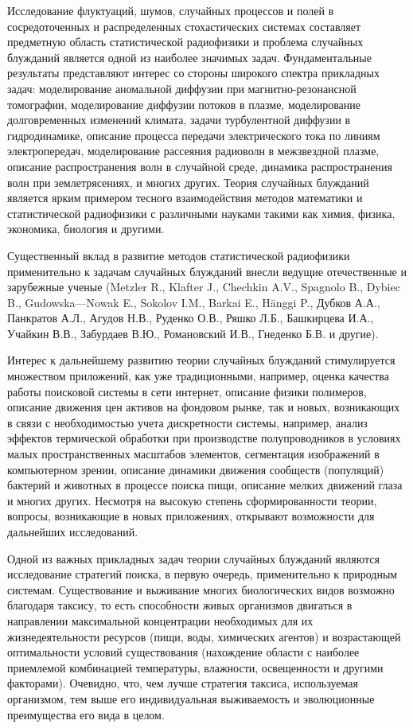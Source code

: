 
{\actuality} 

Исследование флуктуаций, шумов, случайных процессов и полей в сосредоточенных и распределенных стохастических системах составляет предметную область статистической радиофизики и проблема случайных блужданий является одной из наиболее значимых задач. Фундаментальные результаты представляют интерес со стороны широкого спектра прикладных задач: моделирование аномальной диффузии при магнитно-резонансной томографии, моделирование диффузии потоков в плазме, моделирование долговременных изменений климата, задачи турбулентной диффузии в гидродинамике, описание процесса передачи электрического тока по линиям электропередач, моделирование рассеяния радиоволн в межзвездной плазме, описание распространения волн в случайной среде, динамика распространения волн при землетрясениях, и многих других. Теория случайных блужданий является ярким примером тесного взаимодействия методов математики и статистической радиофизики с различными науками такими как химия, физика, экономика, биология и другими.

Существенный вклад в развитие методов статистической радиофизики применительно к задачам случайных блужданий внесли ведущие отечественные и зарубежные ученые (Metzler R., Klafter J., Chechkin A.V., Spagnolo B., Dybiec B., Gudowska—Nowak E., Sokolov I.M., Barkai E., Hänggi P., Дубков А.А., Панкратов А.Л., Агудов Н.В., Руденко О.В., Ряшко Л.Б., Башкирцева И.А., Учайкин В.В., Забурдаев В.Ю., Романовский И.В., Гнеденко Б.В. и другие).

Интерес к дальнейшему развитию теории случайных блужданий стимулируется множеством приложений, как уже традиционными, например, оценка качества работы поисковой системы в сети интернет, описание физики полимеров, описание движения цен активов на фондовом рынке, так и новых, возникающих в связи с необходимостью учета дискретности системы, например, анализ эффектов термической обработки при производстве полупроводников в условиях малых пространственных масштабов элементов, сегментация изображений в компьютерном зрении, описание динамики движения сообществ (популяций) бактерий и животных в процессе поиска пищи, описание мелких движений глаза и многих других. Несмотря на высокую степень сформированности теории, вопросы, возникающие в новых приложениях, открывают возможности для дальнейших исследований. 

Одной из важных прикладных задач теории случайных блужданий являются исследование стратегий поиска, в первую очередь, применительно к природным системам. Существование и выживание многих биологических видов возможно благодаря таксису, то есть способности живых организмов двигаться в направлении максимальной концентрации необходимых для их жизнедеятельности ресурсов (пищи, воды, химических агентов) и возрастающей оптимальности условий существования (нахождение области с наиболее приемлемой комбинацией температуры, влажности, освещенности и другими факторами). Очевидно, что, чем лучше стратегия таксиса, используемая организмом, тем выше его индивидуальная выживаемость и эволюционные преимущества его вида в целом.

